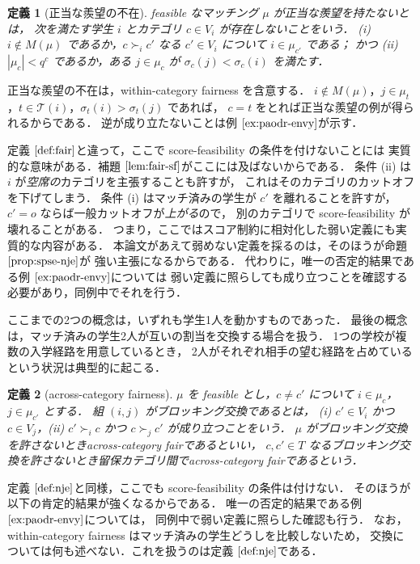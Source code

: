 \documentclass[
    12pt,          %
    a4paper,       %
    oneside,       %
    onecolumn,     %
    titlepage,     %
    final          %
]{jreport} %
\newcommand{\refexample}[1]{例 $\ref{#1}$}
\newcommand{\refdefinition}[1]{定義 $\ref{#1}$}
\newcommand{\refpropositional}[1]{命題 $\ref{#1}$}
\newcommand{\reflemma}[1]{補題 $\ref{#1}$}
\newtheorem{definition}{定義}[chapter]
\renewcommand{\T}{\mathcal{T}}   %
\begin{document}
\begin{definition}[正当な羨望の不在]
\label{def:nje}
feasible なマッチング $\mu$ が\emph{正当な羨望を持たない}とは，
次を満たす学生 $i$ とカテゴリ $c\in V_i$ が存在しないことをいう．
(i) $i\notin M(\mu)$ であるか，$c\succ_i c'$ なる $c'\in V_i$ について $i\in\mu_{c'}$ である；
かつ (ii) $|\mu_c|<q^c$ であるか，ある $j\in\mu_c$ が $\sigma_c(j)<\sigma_c(i)$ を満たす．
\end{definition}

正当な羨望の不在は，within-category fairness を含意する．
$i\notin M(\mu)$，$j\in\mu_t$，$t\in\T(i)$，$\sigma_t(i)>\sigma_t(j)$ であれば，
$c=t$ をとれば正当な羨望の例が得られるからである．
逆が成り立たないことは\refexample{ex:paodr-envy}が示す．

\refdefinition{def:fair}と違って，ここで score-feasibility の条件を付けないことには
実質的な意味がある．\reflemma{lem:fair-sf}がここには及ばないからである．
条件 (ii) は $i$ が\emph{空席の}カテゴリを主張することも許すが，
これはそのカテゴリのカットオフを下げてしまう．
条件 (i) はマッチ済みの学生が $c'$ を離れることを許すが，
$c'=o$ ならば一般カットオフが\emph{上がる}ので，
別のカテゴリで score-feasibility が壊れることがある．
つまり，ここではスコア制約に相対化した弱い定義にも実質的な内容がある．
本論文があえて弱めない定義を採るのは，そのほうが\refpropositional{prop:spse-nje}が
強い主張になるからである．
代わりに，唯一の否定的結果である\refexample{ex:paodr-envy}については
弱い定義に照らしても成り立つことを確認する必要があり，同例中でそれを行う．

ここまでの2つの概念は，いずれも学生1人を動かすものであった．
最後の概念は，マッチ済みの学生2人が互いの割当を交換する場合を扱う．
1つの学校が複数の入学経路を用意しているとき，
2人がそれぞれ相手の望む経路を占めているという状況は典型的に起こる．

\begin{definition}[across-category fairness]
\label{def:swap}
$\mu$ を feasible とし，$c\neq c'$ について $i\in\mu_c$，$j\in\mu_{c'}$ とする．
組 $(i,j)$ が\emph{ブロッキング交換}であるとは，
(i) $c'\in V_i$ かつ $c\in V_j$，(ii) $c'\succ_i c$ かつ $c\succ_j c'$
が成り立つことをいう．
$\mu$ がブロッキング交換を許さないとき\emph{across-category fair}であるといい，
$c,c'\in T$ なるブロッキング交換を許さないとき\emph{留保カテゴリ間でacross-category fair}であるという．
\end{definition}

\refdefinition{def:nje}と同様，ここでも score-feasibility の条件は付けない．
そのほうが以下の肯定的結果が強くなるからである．
唯一の否定的結果である\refexample{ex:paodr-envy}については，
同例中で弱い定義に照らした確認も行う．
なお，within-category fairness はマッチ済みの学生どうしを比較しないため，
交換については何も述べない．これを扱うのは\refdefinition{def:nje}である．
\end{document}
